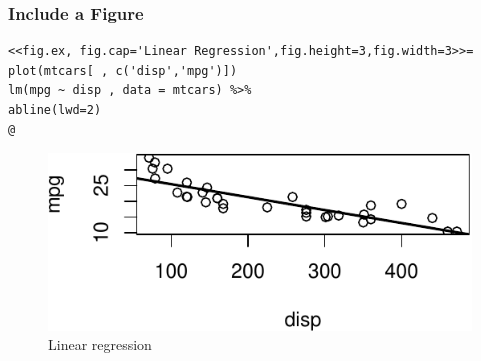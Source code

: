\documentclass[10pt]{beamer}\usepackage[]{graphicx}\usepackage[]{color}
\makeatletter
\def\maxwidth{ %
  \ifdim\Gin@nat@width>\linewidth
    \linewidth
  \else
    \Gin@nat@width
  \fi
}
\newenvironment{kframe}{%
 \def\at@end@of@kframe{}%
 \ifinner\ifhmode%
  \def\at@end@of@kframe{\end{minipage}}%
  \begin{minipage}{\columnwidth}%
 \fi\fi%
 \def\FrameCommand##1{\hskip\@totalleftmargin \hskip-\fboxsep
 \colorbox{shadecolor}{##1}\hskip-\fboxsep
     \hskip-\linewidth \hskip-\@totalleftmargin \hskip\columnwidth}%
 \MakeFramed {\advance\hsize-\width
   \@totalleftmargin\z@ \linewidth\hsize
   \@setminipage}}%
 {\par\unskip\endMakeFramed%
 \at@end@of@kframe}
\newenvironment{knitrout}{}{} %
\makeatother
\begin{document}
\begin{frame}[fragile]
\frametitle{Include a Figure}
\scriptsize
\begin{knitrout}
\color{fgcolor}\begin{kframe}
\begin{verbatim}
<<fig.ex, fig.cap='Linear Regression',fig.height=3,fig.width=3>>=
plot(mtcars[ , c('disp','mpg')])
lm(mpg ~ disp , data = mtcars) %>%
abline(lwd=2)
@
\end{verbatim}
\end{kframe}
\end{knitrout}
\begin{knitrout}
\color{fgcolor}\begin{figure}

{\centering \includegraphics[width=\maxwidth]{figure/slr7-1} 

}

\caption[Linear regression]{Linear regression}\label{fig:slr7}
\end{figure}


\end{knitrout}
\end{frame}
\end{document}

